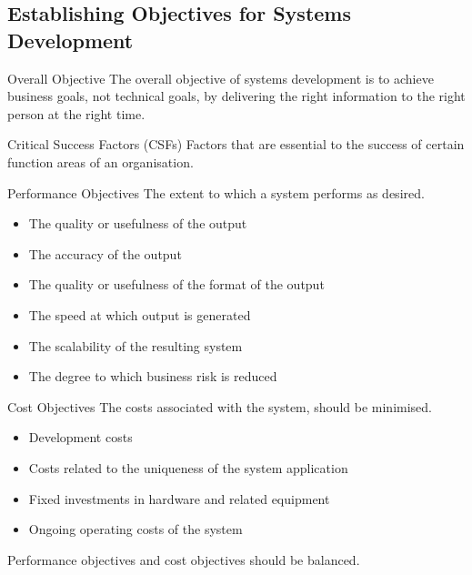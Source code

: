 \documentclass[\main/notes.tex]{subfiles}
\begin{document}
			\subsection{Establishing Objectives for Systems Development}
				\begin{sidenote}{Overall Objective}
					The overall objective of systems development is to achieve business goals, not technical goals, by delivering the right information to the right person at the right time.
				\end{sidenote}
				\begin{definition}{Critical Success Factors (CSFs)}
					Factors that are essential to the success of certain function areas of an organisation.
				\end{definition}
				\begin{definition}{Performance Objectives}
					The extent to which a system performs as desired.
					\begin{multicols}{2}
						\begin{itemize}[nosep]
							\item The quality or usefulness of the output
							\item The accuracy of the output
							\item The quality or usefulness of the format of the output
							\item The speed at which output is generated
							\item The scalability of the resulting system
							\item The degree to which business risk is reduced
						\end{itemize}
					\end{multicols}
				\end{definition}
				\begin{definition}{Cost Objectives}
					The costs associated with the system, should be minimised.
					\begin{multicols}{2}
						\begin{itemize}[nosep]
							\item Development costs
							\item Costs related to the uniqueness of the system application
							\item Fixed investments in hardware and related equipment
							\item Ongoing operating costs of the system
						\end{itemize}
					\end{multicols}
				\end{definition}
				Performance objectives and cost objectives should be balanced.

	\vbox{}
\end{document}
